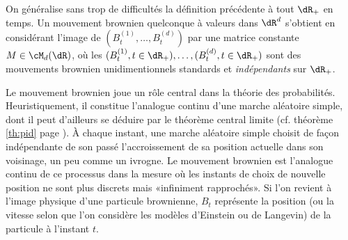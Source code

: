 On généralise sans trop de difficultés la définition précédente à tout $\dR_+$
en temps. Un mouvement brownien quelconque à valeurs dans $\dR^d$ s'obtient en
considérant l'image de $(B^{(1)}_t,\ldots,B^{(d)}_t)$ par une matrice
constante $M\in\cM_d(\dR)$, où les
$(B^{(1)}_t,t\in\dR_+),\ldots,(B^{(d)}_t,t\in\dR_+)$ sont des mouvements
brownien unidimentionnels standards et \emph{indépendants} sur $\dR_+$.

Le mouvement brownien joue un rôle central dans la théorie des probabilités.
Heuristiquement, il constitue l'analogue continu d'une marche aléatoire
simple, dont il peut d'ailleurs se déduire par le théorème central limite (cf.
théorème \ref{th:pid} page \pageref{th:pid}). À chaque instant, une marche
aléatoire simple choisit de façon indépendante de son passé l'accroissement de
sa position actuelle dans son voisinage, un peu comme un ivrogne. Le mouvement
brownien est l'analogue continu de ce processus dans la mesure où les instants
de choix de nouvelle position ne sont plus discrets mais «infiniment
rapprochés». Si l'on revient à l'image physique d'une particule brownienne,
$B_t$ représente la position (ou la vitesse selon que l'on considère les
modèles d'Einstein ou de Langevin) de la particule à l'instant $t$.

